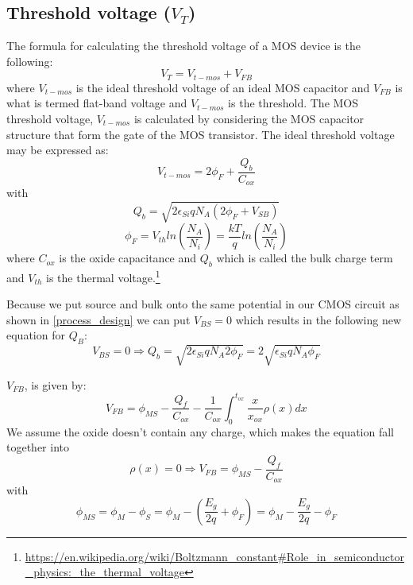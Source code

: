 \subsection{Threshold voltage ($V_T$)}
The formula for calculating the threshold voltage of a MOS device is the following:
\begin{equation}
V_T = V_{t-mos} + V_{FB}
\end{equation}
where $V_{t-mos}$ is the ideal threshold voltage of an ideal MOS capacitor and $V_{FB}$ is what is termed flat-band voltage and $V_{t-mos}$ is the threshold.
The MOS threshold voltage, $V_{t-mos}$ is calculated by considering the MOS capacitor structure that form the gate of the MOS transistor.
The ideal threshold voltage may be expressed as:
\begin{equation}
V_{t-mos}=2 \phi_F + \frac{Q_b}{C_{ox}}
\end{equation}
with
\begin{equation}
Q_b
=
\sqrt{2 \epsilon_{Si} q N_A ( 2 \phi_F + V_{SB}) }
\end{equation}
\begin{equation}
\phi_F
=
V_{th} ln\left(\frac{N_A}{N_i}\right)
=
\frac{k T}{q} ln\left(\frac{N_A}{N_i}\right)
\end{equation}
where $C_{ox}$ is the oxide capacitance and $Q_b$ which is called the bulk charge term and $V_{th}$ is the thermal voltage.\footnote{\url{https://en.wikipedia.org/wiki/Boltzmann_constant\#Role_in_semiconductor_physics:_the_thermal_voltage}}

Because we put source and bulk onto the same potential in our CMOS circuit as shown in \autoref{process_design} we can put $V_{BS}=0$ which results in the following new equation for $Q_B$:
\begin{equation}
V_{BS}=0
\Rightarrow
Q_b
=
\sqrt{2 \epsilon_{Si} q N_A 2 \phi_F }
=
2 \sqrt{\epsilon_{Si} q N_A \phi_F }
\end{equation}

 $V_{FB}$, is given by:
\begin{equation}
V_{FB}
=
\phi_{MS}-\frac{Q_f}{C_{ox}}-\frac{1}{C_{ox}}\int_{0}^{t_{ox}}\frac{x}{x_{ox}}\rho(x) dx
\end{equation}
We assume the oxide doesn't contain any charge, which makes the equation fall together into
\begin{equation}
\rho(x)=0
\Rightarrow
V_{FB}
=
\phi_{MS}-\frac{Q_f}{C_{ox}}
\end{equation}
with
\begin{equation}
\phi_{MS}
=
\phi_{M} - \phi_{S}
=
\phi_{M} -  \left( \frac{E_g}{2 q} + \phi_F \right)
=
\phi_{M} - \frac{E_g}{2 q} - \phi_F
\end{equation}

